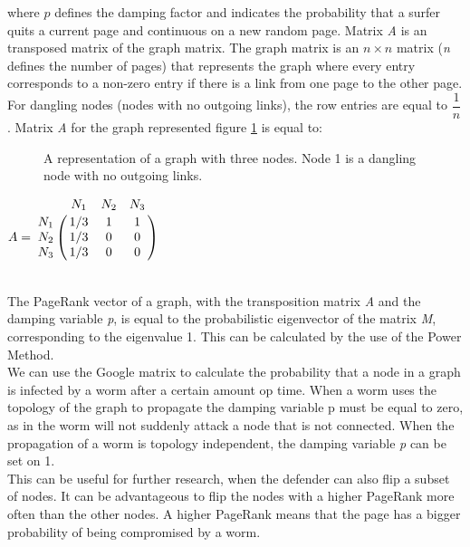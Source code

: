 where $p$ defines the damping factor and indicates the probability that a surfer quits a current page and continuous on a new random page. Matrix \textit{A} is an transposed matrix of the graph matrix. The graph matrix is an $n \times n$ matrix (\textit{n} defines the number of pages) that represents the graph where every entry corresponds to a non-zero entry if there is a link from one page to the other page. For dangling nodes (nodes with no outgoing links), the row entries are equal to $\dfrac{1}{n}$. Matrix \textit{A} for the graph represented figure \ref{GoogleMatrix} is equal to:


\begin{figure}
\centering
{}
\caption{A representation of a graph with three nodes. Node 1 is a dangling node with no outgoing links.}
\label{GoogleMatrix}
\end{figure}

$ A =
\bordermatrix{
         & N_1		& N_2	& N_3	 \cr
    N_1   & 1/3		& 1		& 1			     \cr
    N_2   & 1/3		& 0		& 0		     \cr
    N_3   & 1/3		& 0		& 0		 \cr
  }$ 
 
~~\\

The PageRank vector of a graph, with the transposition matrix\textit{ A} and the damping variable \textit{p}, is equal to the probabilistic eigenvector of the matrix \textit{M}, corresponding to the eigenvalue 1. This can be calculated by the use of the Power Method. \\

We can use the Google matrix to calculate the probability that a node in a graph is infected by a worm after a certain amount op time. When a worm uses the topology of the graph to propagate the damping variable p must be equal to zero, as in the worm will not suddenly attack a node that is not connected. When the propagation of a worm is topology independent, the damping variable \textit{p} can be set on 1. \\
This can be useful for further research, when the defender can also flip a subset of nodes. It can be advantageous to flip the nodes with a higher PageRank more often than the other nodes. A higher PageRank means that the page has a bigger probability of being compromised by a worm. 
